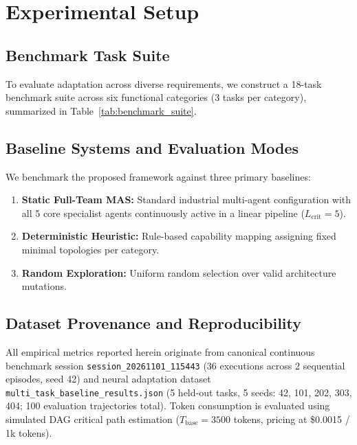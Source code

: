 \documentclass[conference]{IEEEtran}
\begin{document}
\section{Experimental Setup}
\label{sec:experimental_setup}

\subsection{Benchmark Task Suite}
To evaluate adaptation across diverse requirements, we construct a 18-task benchmark suite across six functional categories (3 tasks per category), summarized in Table~\ref{tab:benchmark_suite}.



\subsection{Baseline Systems and Evaluation Modes}
We benchmark the proposed framework against three primary baselines:
\begin{enumerate}[leftmargin=*]
    \item \textbf{Static Full-Team MAS:} Standard industrial multi-agent configuration with all 5 core specialist agents continuously active in a linear pipeline ($L_{\mathrm{crit}} = 5$).
    \item \textbf{Deterministic Heuristic:} Rule-based capability mapping assigning fixed minimal topologies per category.
    \item \textbf{Random Exploration:} Uniform random selection over valid architecture mutations.
\end{enumerate}

\subsection{Dataset Provenance and Reproducibility}
All empirical metrics reported herein originate from canonical continuous benchmark session \texttt{session\_20261101\_115443} (36 executions across 2 sequential episodes, seed 42) and neural adaptation dataset \texttt{multi\_task\_baseline\_results.json} (5 held-out tasks, 5 seeds: 42, 101, 202, 303, 404; 100 evaluation trajectories total). Token consumption is evaluated using simulated DAG critical path estimation ($T_{\mathrm{base}} = 3500$ tokens, pricing at \$0.0015 / 1k tokens).
\end{document}
